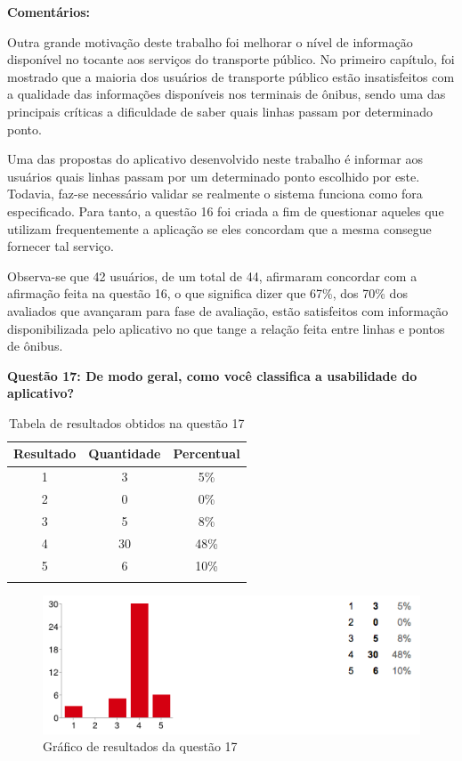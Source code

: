 \textbf{Comentários:}

Outra grande motivação deste trabalho foi melhorar o nível de informação disponível no tocante aos serviços do transporte público. No primeiro capítulo, foi mostrado que a maioria dos usuários de transporte público estão insatisfeitos com a qualidade das informações disponíveis nos terminais de ônibus, sendo uma das principais críticas a dificuldade de saber quais linhas passam por determinado ponto. 

Uma das propostas do aplicativo desenvolvido neste trabalho é informar aos usuários quais linhas passam por um determinado ponto escolhido por este. Todavia, faz-se necessário validar se realmente o sistema funciona como fora especificado. Para tanto, a questão 16 foi criada a fim de questionar aqueles que utilizam frequentemente a aplicação se eles concordam que a mesma consegue fornecer tal serviço.

Observa-se que 42 usuários, de um total de 44, afirmaram concordar com a afirmação feita na questão 16, o que significa dizer que 67\%, dos 70\% dos avaliados que avançaram para fase de avaliação, estão satisfeitos com informação disponibilizada pelo aplicativo no que tange a relação feita entre linhas e pontos de ônibus. \newline

\textbf{Questão 17: De modo geral, como você classifica a usabilidade do aplicativo?}

\begin{center}
\begin{longtable}{c|c|c}
\hline
    \multicolumn{1}{c}{\textbf{Resultado}} & \multicolumn{1}{c}{\textbf{Quantidade}} & \multicolumn{1}{c}{\textbf{Percentual}} \\
\hline
    1 & 3 &  5\%\\
    \hline
    2 & 0 & 0\%\\
    \hline
    3 & 5 &  8\%\\
    \hline
    4 & 30 & 48\%\\
    \hline
    5 & 6 & 10\%\\
    \hline
\caption{Tabela de resultados obtidos na questão 17}
\label{tabq17}
\end{longtable}
\end{center}


\begin{figure}[h]
\begin{center}
  \includegraphics[width=16cm]{images/graficos/questao17.png}
  \caption{Gráfico de resultados da questão 17}
  \label{fig:questao17}
\end{center}
\end{figure}

